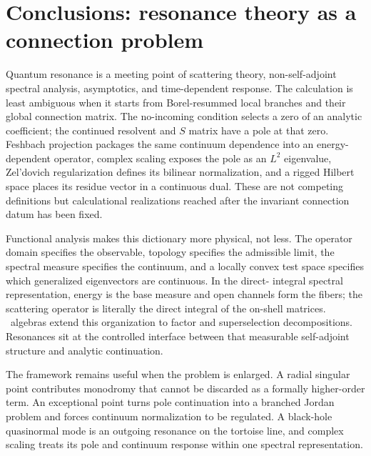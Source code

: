 \section{Conclusions: resonance theory as a connection problem}
\label{sec:conclusions}

Quantum resonance is a meeting point of scattering theory, non-self-adjoint
spectral analysis, asymptotics, and time-dependent response.  The calculation
is least ambiguous when it starts from Borel-resummed local branches and their
global connection matrix.  The no-incoming condition selects a zero of an
analytic coefficient; the continued resolvent and $S$ matrix have a pole at
that zero.  Feshbach projection packages the same continuum dependence into an
energy-dependent operator, complex scaling exposes the pole as an $L^2$
eigenvalue, Zel'dovich regularization defines its bilinear normalization, and
a rigged Hilbert space places its residue vector in a continuous dual.  These
are not competing definitions but calculational realizations reached after
the invariant connection datum has been fixed.

Functional analysis makes this dictionary more physical, not less.  The
operator domain specifies the observable, topology specifies the admissible
limit, the spectral measure specifies the continuum, and a locally convex test
space specifies which generalized eigenvectors are continuous.  In the direct-
integral spectral representation, energy is the base measure and open channels
form the fibers; the scattering operator is literally the direct integral of
the on-shell matrices.  \vN\ algebras extend this organization to
factor and superselection decompositions.  Resonances sit at the controlled
interface between that measurable self-adjoint structure and analytic
continuation.

The framework remains useful when the problem is enlarged.  A radial singular
point contributes monodromy that cannot be discarded as a formally higher-order term.  An exceptional point turns pole continuation into a branched
Jordan problem and forces continuum normalization to be regulated.  A
black-hole quasinormal mode is an outgoing resonance on the tortoise line, and
complex scaling treats its pole and continuum response within one spectral
representation.

